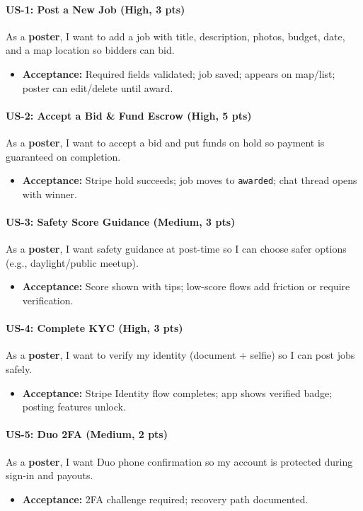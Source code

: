 \documentclass[11pt]{article}
\begin{document}
\paragraph{US-1: Post a New Job (High, 3 pts)}
As a \textbf{poster}, I want to add a job with title, description, photos, budget, date, and a map location so bidders can bid.
\begin{itemize}[leftmargin=1.4em]
  \item \textbf{Acceptance:} Required fields validated; job saved; appears on map/list; poster can edit/delete until award.
\end{itemize}

\paragraph{US-2: Accept a Bid \& Fund Escrow (High, 5 pts)}
As a \textbf{poster}, I want to accept a bid and put funds on hold so payment is guaranteed on completion.
\begin{itemize}[leftmargin=1.4em]
  \item \textbf{Acceptance:} Stripe hold succeeds; job moves to \texttt{awarded}; chat thread opens with winner.
\end{itemize}

\paragraph{US-3: Safety Score Guidance (Medium, 3 pts)}
As a \textbf{poster}, I want safety guidance at post-time so I can choose safer options (e.g., daylight/public meetup).
\begin{itemize}[leftmargin=1.4em]
  \item \textbf{Acceptance:} Score shown with tips; low-score flows add friction or require verification.
\end{itemize}

\paragraph{US-4: Complete KYC (High, 3 pts)}
As a \textbf{poster}, I want to verify my identity (document + selfie) so I can post jobs safely.
\begin{itemize}[leftmargin=1.4em]
  \item \textbf{Acceptance:} Stripe Identity flow completes; app shows verified badge; posting features unlock.
\end{itemize}

\paragraph{US-5: Duo 2FA (Medium, 2 pts)}
As a \textbf{poster}, I want Duo phone confirmation so my account is protected during sign-in and payouts.
\begin{itemize}[leftmargin=1.4em]
  \item \textbf{Acceptance:} 2FA challenge required; recovery path documented.
\end{itemize}
\end{document}
